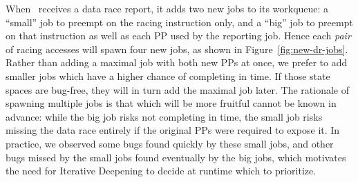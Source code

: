 When \quicksand~receives a data race report, it adds two new jobs to its workqueue:
a ``small'' job to preempt on the racing instruction only,
and a ``big'' job to preempt on that instruction as well as each PP used by the reporting job.
%
Hence each {\em pair} of racing accesses will spawn four new jobs, as shown in Figure~\ref{fig:new-dr-jobs}.
Rather than adding a maximal job with both new PPs at once, we prefer to add smaller jobs which have a higher chance of completing in time.
If those state spaces are bug-free, they will in turn add the maximal job later.
%
The rationale of spawning multiple jobs is that which will be more fruitful cannot be known in advance:
while the big job risks not completing in time,
the small job risks missing the data race entirely if the original PPs were required to expose it.
In practice, we observed some bugs found quickly by these small jobs, and other bugs missed by the small jobs found eventually by the big jobs,
which motivates the need for Iterative Deepening to decide at runtime which to prioritize.





